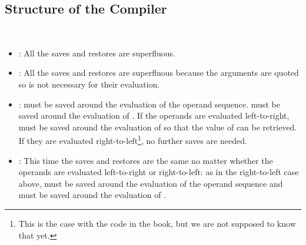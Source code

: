 \subsection{Structure of the Compiler}

\begin{exe}[5.31]
    \label{5.31}
    \ \vspace{-20pt}
    \begin{itemize}
        \item {}: All the saves and restores are superfluous.
        \item {}: All the saves and restores are superfluous 
            because the arguments are quoted so  is not necessary for 
            their evaluation.
        \item {}:  must be saved around the 
            evaluation of the operand sequence.  must be saved around 
            the evaluation of . If the operands are evaluated 
            left-to-right,  must be saved around the evaluation of 
             so that the value of  can be retrieved. If 
            they are evaluated right-to-left\footnote{This is the case with the 
            code in the book, but we are not supposed to know that yet.}, no 
            further saves are needed.
        \item {}: This time the saves and restores are the 
            same no matter whether the operands are evaluated left-to-right or 
            right-to-left: as in the right-to-left case above,  must 
            be saved around the evaluation of the operand sequence and 
             must be saved around the evaluation of .
    \end{itemize}
\end{exe}

